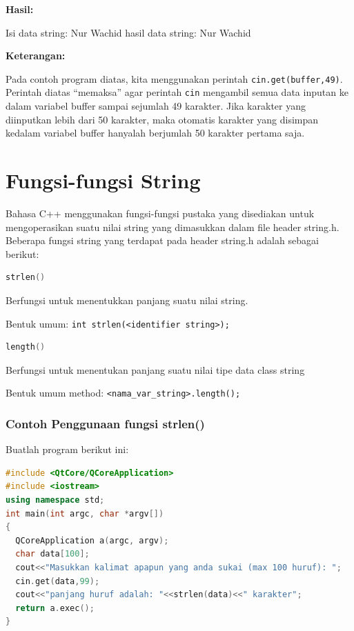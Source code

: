 \textbf{Hasil:}
\begin{lcverbatim}
Isi data string: Nur Wachid
hasil data string: Nur Wachid
\end{lcverbatim}


\textbf{Keterangan:}

Pada contoh program diatas, kita menggunakan perintah
\texttt{cin.get(buffer,49)}. Perintah diatas ``memaksa'' agar perintah
\texttt{cin} mengambil semua data inputan ke dalam variabel buffer
sampai sejumlah 49 karakter. Jika karakter yang diinputkan lebih dari 50
karakter, maka otomatis karakter yang disimpan kedalam variabel buffer
hanyalah berjumlah 50 karakter pertama saja.

\section{Fungsi-fungsi String}\label{fungsi-fungsi-string}

Bahasa C++ menggunakan fungsi-fungsi pustaka yang disediakan untuk
mengoperasikan suatu nilai string yang dimasukkan dalam file header
string.h. Beberapa fungsi string yang terdapat pada header string.h
adalah sebagai berikut:

\begin{lstlisting}[language=c++, numbers=none]
strlen()
\end{lstlisting}

Berfungsi untuk menentukkan panjang suatu nilai string.

Bentuk umum:
\texttt{int\ strlen(\textless{}identifier\ string\textgreater{});}

\begin{lstlisting}[language=c++, numbers=none]
length()
\end{lstlisting}

Berfungsi untuk menentukan panjang suatu nilai tipe data class string

Bentuk umum method:
\texttt{\textless{}nama\_var\_string\textgreater{}.length();}

\subsubsection*{Contoh  Penggunaan fungsi strlen()}

Buatlah program berikut ini:

\begin{lstlisting}[language=c++, caption=Penggunaan fungsi strlen(), label=contoh3-18]
#include <QtCore/QCoreApplication>
#include <iostream>
using namespace std;
int main(int argc, char *argv[])
{
  QCoreApplication a(argc, argv);
  char data[100];
  cout<<"Masukkan kalimat apapun yang anda sukai (max 100 huruf): ";
  cin.get(data,99);
  cout<<"panjang huruf adalah: "<<strlen(data)<<" karakter";
  return a.exec();
}
\end{lstlisting}

